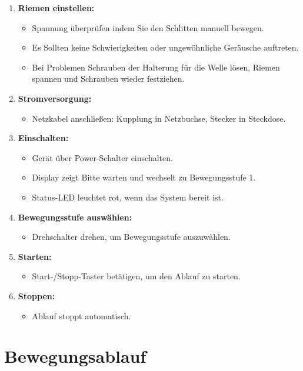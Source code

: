 \documentclass[12pt,a4paper]{scrbook}
\begin{document}
	\begin{enumerate}
		\item \textbf{Riemen einstellen:}
		\begin{itemize}
			\item Spannung überprüfen indem Sie den Schlitten manuell bewegen.
			\item Es Sollten keine Schwierigkeiten oder ungewöhnliche Geräusche auftreten.
			\item Bei Problemen Schrauben der Halterung für die Welle lösen, Riemen spannen und Schrauben wieder festziehen.
		\end{itemize}
		\item \textbf{Stromversorgung:}
		\begin{itemize}
			\item Netzkabel anschließen: Kupplung in Netzbuchse, Stecker in Steckdose.
		\end{itemize}
		\item \textbf{Einschalten:}
		\begin{itemize}
			\item Gerät über Power-Schalter einschalten.
			\item Display zeigt Bitte warten und wechselt zu Bewegungsstufe 1.
			\item Status-LED leuchtet rot, wenn das System bereit ist.
		\end{itemize}
		\item \textbf{Bewegungsstufe auswählen:}
		\begin{itemize}
			\item Drehschalter drehen, um Bewegungsstufe auszuwählen.
		\end{itemize}
		\item \textbf{Starten:}
		\begin{itemize}
			\item Start-/Stopp-Taster betätigen, um den Ablauf zu starten.
		\end{itemize}
		\item \textbf{Stoppen:}
		\begin{itemize}
			\item Ablauf stoppt automatisch.
		\end{itemize}
	\end{enumerate}
	
		\section{Bewegungsablauf}
	
\end{document}
